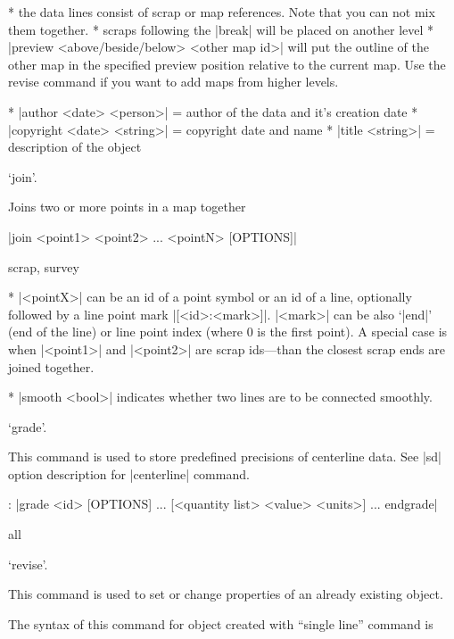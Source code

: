 \comopt
  * the data lines consist of scrap or map references. Note that
    you can not mix them together.
  * scraps following the |break| will be placed on another level
  * |preview <above/beside/below> <other map id>| will put the outline of
    the other map in the specified preview position relative to the
    current map. Use the revise command if you want to add maps
    from higher levels.
\endcomopt

\options
  * |author <date> <person>| = author of the data and it's creation date
  * |copyright <date> <string>| = copyright date and name
  * |title <string>| = description of the object
\endoptions


\subsubchapter `join'.

\description
  Joins two or more points in a map together
\enddescription

\syntax
  |join <point1> <point2> ... <pointN> [OPTIONS]|
\endsyntax

\context
  scrap, survey
\endcontext

\arguments
   * |<pointX>| can be an id of a point symbol or an id of a line,
     optionally followed by a line point mark |[<id>:<mark>]|.
     |<mark>| can be also `|end|' (end of the line) or line point index
     (where 0 is the first point). A special case is when |<point1>|
     and |<point2>| are scrap ids---than the closest scrap ends are
     joined together.
\endarguments

\options
  * |smooth <bool>| indicates whether two lines are to be connected 
    smoothly.
\endoptions


\subsubchapter `grade'.

\description
   This command is used to store predefined precisions of centerline data.
   See |sd| option description for |centerline| command. 
\enddescription

\syntax:
  |grade <id> [OPTIONS]
        ...
        [<quantity list> <value> <units>]
        ...
        endgrade|
\endsyntax

\context
  all
\endcontext

\arguments
\endarguments

\options
\endoptions


\subsubchapter `revise'.

\description
  This command is used to set or change properties of an already 
  existing object.
\enddescription

\syntax
  The syntax of this command for 
  object created with ``single line'' command is
  
